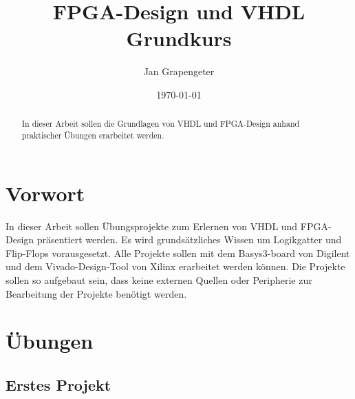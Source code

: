 \documentclass{article}
\begin{document}
\title{FPGA-Design und VHDL Grundkurs}
\author{Jan Grapengeter}
\date{\today}
\maketitle
\begin{abstract}
In dieser Arbeit sollen die Grundlagen von VHDL und FPGA-Design anhand praktischer \"Ubungen erarbeitet werden.
\end{abstract}
\renewcommand{\contentsname}{Inhaltsangabe}
\tableofcontents
\renewcommand{\listfigurename}{Bildverzeichnis}
\listoffigures
\renewcommand{\listtablename}{Tabellenverzeichnis}
\listoftables

\section{Vorwort}
In dieser Arbeit sollen \"Ubungsprojekte zum Erlernen von VHDL und FPGA-Design pr\"asentiert werden. Es wird grunds\"atzliches Wissen um Logikgatter und Flip-Flops vorausgesetzt. Alle Projekte sollen mit dem Basys3-board von Digilent und dem Vivado-Design-Tool von Xilinx erarbeitet werden k\"onnen. Die Projekte sollen so aufgebaut sein, dass keine externen Quellen oder Peripherie zur Bearbeitung der Projekte ben\"otigt werden. 

\section{\"Ubungen}
\subsection{Erstes Projekt}
\end{document}
